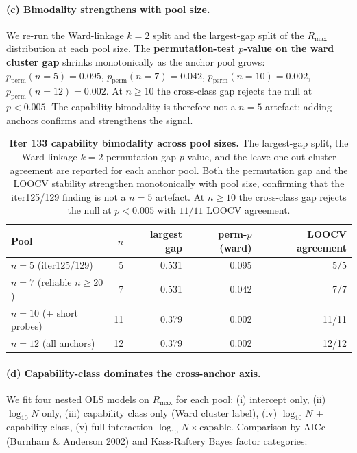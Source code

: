 \documentclass{article}
\begin{document}
\paragraph{(c) Bimodality strengthens with pool size.}
\label{par:scaling-iter133-bimod}
We re-run the Ward-linkage $k=2$ split and the largest-gap split
of the $R_{\max}$ distribution at each pool size.  The
\textbf{permutation-test $p$-value on the ward cluster gap}
shrinks monotonically as the anchor pool grows:
$p_{\text{perm}}(n=5) = 0.095$,
$p_{\text{perm}}(n=7) = 0.042$,
$p_{\text{perm}}(n=10) = 0.002$,
$p_{\text{perm}}(n=12) = 0.002$.
At $n \ge 10$ the cross-class gap rejects the null at
$p < 0.005$.  The capability bimodality is therefore not a
$n = 5$ artefact: adding anchors confirms and strengthens the
signal.

\begin{table}[t]
  \centering
  \small
  \begin{tabular}{lrrrr}
    \toprule
    Pool & $n$ & largest gap & perm-$p$(ward) & LOOCV agreement \\
    \midrule
    $n=5$ (iter125/129)        &  5 & 0.531 & 0.095 & 5/5   \\
    $n=7$ (reliable $n \ge 20$)&  7 & 0.531 & 0.042 & 7/7   \\
    $n=10$ (+ short probes)    & 11 & 0.379 & 0.002 & 11/11 \\
    $n=12$ (all anchors)       & 12 & 0.379 & 0.002 & 12/12 \\
    \bottomrule
  \end{tabular}
  \caption{\textbf{Iter 133 capability bimodality across pool sizes.}
    The largest-gap split, the Ward-linkage $k=2$ permutation gap
    $p$-value, and the leave-one-out cluster agreement are reported
    for each anchor pool.  Both the permutation gap and the LOOCV
    stability strengthen monotonically with pool size, confirming
    that the iter125/129 finding is not a $n = 5$ artefact.  At
    $n \ge 10$ the cross-class gap rejects the null at $p < 0.005$
    with $11/11$ LOOCV agreement.}
  \label{tab:scaling-iter133-bimod}
\end{table}

\paragraph{(d) Capability-class dominates the cross-anchor axis.}
\label{par:scaling-iter133-class}
We fit four nested OLS models on $R_{\max}$ for each pool: (i)
intercept only, (ii) $\log_{10} N$ only, (iii) capability class
only (Ward cluster label), (iv) $\log_{10} N$ + capability class,
(v) full interaction $\log_{10} N \times \text{capable}$.
Comparison by AICc (Burnham \& Anderson 2002) and Kass-Raftery
Bayes factor categories:
\end{document}
